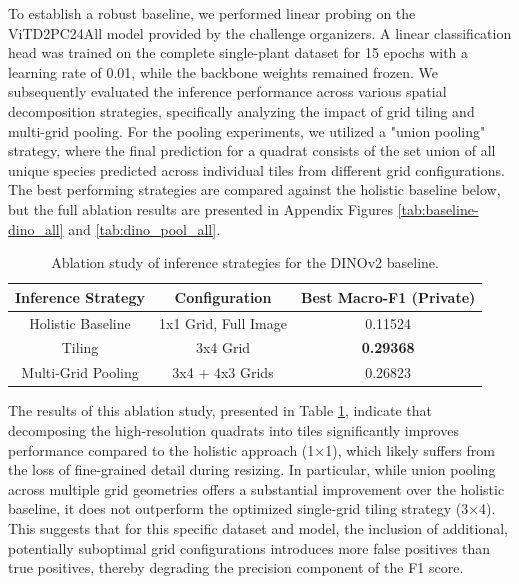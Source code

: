 \documentclass[conference]{IEEEtran}
\begin{document}
To establish a robust baseline, we performed linear probing on the ViTD2PC24All model provided by the challenge organizers. A linear classification head was trained on the complete single-plant dataset for 15 epochs with a learning rate of 0.01, while the backbone weights remained frozen. We subsequently evaluated the inference performance across various spatial decomposition strategies, specifically analyzing the impact of grid tiling and multi-grid pooling. For the pooling experiments, we utilized a "union pooling" strategy, where the final prediction for a quadrat consists of the set union of all unique species predicted across individual tiles from different grid configurations. The best performing strategies are compared against the holistic baseline below, but the full ablation results are presented in Appendix Figures \ref{tab:baseline-dino_all} and \ref{tab:dino_pool_all}.

\begin{table}[H]
\centering
\caption{Ablation study of inference strategies for the DINOv2 baseline.}
\label{tab:dino_ablations}
\begin{tabular}{@{}ccc@{}}
\toprule
\textbf{Inference Strategy}  & \textbf{Configuration}     & \textbf{Best Macro-F1 (Private)} \\ \midrule
Holistic Baseline            & 1x1 Grid, Full Image       & 0.11524                          \\
Tiling                       & 3x4 Grid                   & \textbf{0.29368}                 \\
Multi-Grid Pooling           & 3x4 + 4x3 Grids            & 0.26823                          \\ \bottomrule
\end{tabular}
\end{table}

The results of this ablation study, presented in Table \ref{tab:dino_ablations}, indicate that decomposing the high-resolution quadrats into tiles significantly improves performance compared to the holistic approach (1×1), which likely suffers from the loss of fine-grained detail during resizing. In particular, while union pooling across multiple grid geometries offers a substantial improvement over the holistic baseline, it does not outperform the optimized single-grid tiling strategy (3×4). This suggests that for this specific dataset and model, the inclusion of additional, potentially suboptimal grid configurations introduces more false positives than true positives, thereby degrading the precision component of the F1 score.
\end{document}
